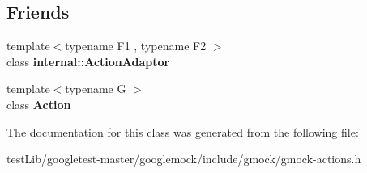 \subsection*{Friends}
\begin{DoxyCompactItemize}
\item 
\mbox{\label{classtesting_1_1Action_a66fe4f9c9b9d020273151aa6054b491e}} 
{\footnotesize template$<$typename F1 , typename F2 $>$ }\\class {\bfseries internal\+::\+Action\+Adaptor}
\item 
\mbox{\label{classtesting_1_1Action_a62bc48ff11968b6e45d21c4b49f349fb}} 
{\footnotesize template$<$typename G $>$ }\\class {\bfseries Action}
\end{DoxyCompactItemize}


The documentation for this class was generated from the following file\+:\begin{DoxyCompactItemize}
\item 
test\+Lib/googletest-\/master/googlemock/include/gmock/gmock-\/actions.\+h\end{DoxyCompactItemize}
